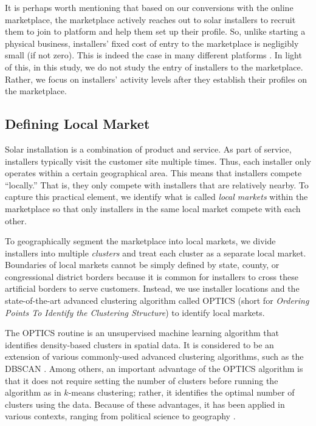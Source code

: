 \documentclass[msom,blindrev]{informs3}
\begin{document}
It is perhaps worth mentioning that based on our conversions with the online marketplace, the marketplace actively reaches out to solar installers to recruit them to join to platform and help them set up their profile. So, unlike starting a physical business, installers' fixed cost of entry to the marketplace is negligibly small (if not zero). This is indeed the case in many different platforms \citep{haddad2015consumer}. In light of this, in this study, we do not study the entry of installers to the marketplace. Rather, we focus on installers' activity levels after they establish their profiles on the marketplace.







\subsection{Defining Local Market}
\label{defining_local_market}


Solar installation is a combination of product and service. As part of service, installers typically visit the customer site multiple times. Thus, each installer only operates  within a certain geographical area. This means that installers compete ``locally.'' That is, they only compete with installers that are relatively nearby. To capture this practical element, we identify what is called \emph{local markets} within the marketplace so that only installers in the same local market compete with each other.

To geographically segment the marketplace into local markets, we divide installers into multiple \emph{clusters} and treat each cluster as a separate local market. Boundaries of local markets cannot be simply defined by state, county, or congressional district borders because it is common for installers to cross these artificial borders to serve customers. Instead, we use installer locations and the state-of-the-art advanced clustering algorithm called OPTICS (short for \textit{Ordering Points To Identify the Clustering Structure}) to identify local markets.

The OPTICS routine is an unsupervised machine learning algorithm that identifies density-based clusters in spatial data. It is considered to be an extension of various commonly-used advanced clustering algorithms, such as the DBSCAN \citep{kanagala2016comparative}. Among others, an important advantage of the OPTICS algorithm is that it does not require setting the number of clusters before running the algorithm as in $k$-means clustering; rather, it identifies the optimal number of clusters using the data. Because of these advantages, it has been applied in various contexts, ranging from political science \citep{davidson2019neighborhood} to geography \citep{teimouri2016method}.
\end{document}
